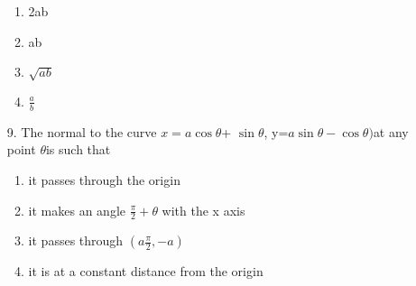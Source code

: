 \documentclass[journal,12pt,twocolumn]{IEEEtran}
\theoremstyle{remark}
\begin{document}
\begin{enumerate}
\begin{enumerate}
																     \item 2ab
																         \item ab
																	     \item $\sqrt{ab}$
																	         \item $\frac{a}{b}$
																		 \end{enumerate}
																		 \item [9.]The normal to the curve $x=a \cos \theta$+ $\sin\theta$, y=$a\sin\theta - \cos \theta)$at any point $\theta$is such that
																		 \begin{enumerate}
																		     \item it passes through the origin
																		         \item it makes an angle $\frac{\pi}{2}+\theta$ with the x axis
																			     \item it passes through $(a\frac{\pi}{2},-a)$
																			         \item it is at a constant distance from the origin
																				 \end{enumerate}
																				 \end{enumerate}
																				 \newpage
\end{document}
